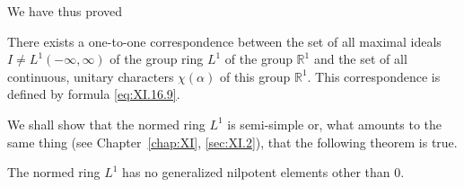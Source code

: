 We have thus proved 

\begin{theorem}\label{thm:XI.16.Theorem.1} There exists a one-to-one correspondence between the set of all maximal ideals $I \neq L^{1}(-\infty, \infty)$ of the group ring $L^{1}$ of the group $\mathbb{R}^{1}$ and the set of all continuous, unitary characters $\chi(\alpha)$ of this group $\mathbb{R}^{1}$. This correspondence is defined by formula \eqref{eq:XI.16.9}. 
\end{theorem}

We shall show that the normed ring $L^{1}$ is semi-simple or, what amounts to the same thing (see Chapter~\ref{chap:XI}, \ref{sec:XI.2}), that the following theorem is true. 

\begin{theorem}\label{thm:XI.16.Theorem.2} The normed ring $L^{1}$ has no generalized nilpotent elements other than $0$. 
\end{theorem}

